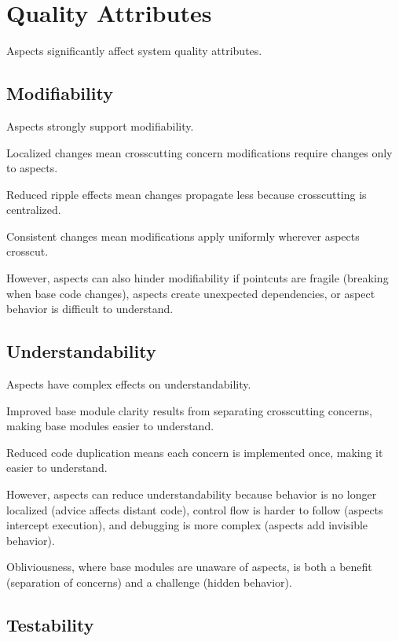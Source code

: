 \documentclass[11pt]{article}
\begin{document}
\section{Quality Attributes}

Aspects significantly affect system quality attributes.

\subsection{Modifiability}

Aspects strongly support modifiability.

Localized changes mean crosscutting concern modifications require changes only to aspects.

Reduced ripple effects mean changes propagate less because crosscutting is centralized.

Consistent changes mean modifications apply uniformly wherever aspects crosscut.

However, aspects can also hinder modifiability if pointcuts are fragile (breaking when base code changes), aspects create unexpected dependencies, or aspect behavior is difficult to understand.

\subsection{Understandability}

Aspects have complex effects on understandability.

Improved base module clarity results from separating crosscutting concerns, making base modules easier to understand.

Reduced code duplication means each concern is implemented once, making it easier to understand.

However, aspects can reduce understandability because behavior is no longer localized (advice affects distant code), control flow is harder to follow (aspects intercept execution), and debugging is more complex (aspects add invisible behavior).

Obliviousness, where base modules are unaware of aspects, is both a benefit (separation of concerns) and a challenge (hidden behavior).

\subsection{Testability}
\end{document}
